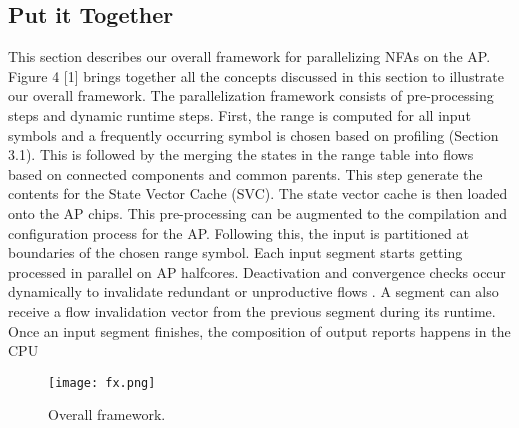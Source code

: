 \subsection{Put it Together}
This section describes our overall framework for parallelizing NFAs
on the AP. Figure 4 [1] brings together all the concepts discussed in this
section to illustrate our overall framework. The parallelization framework consists of pre-processing steps and dynamic runtime steps.
First, the range is computed for all input symbols and a frequently
occurring symbol is chosen based on profiling (Section 3.1). This
is followed by the merging the states in the range table into flows
based on connected components and common parents.
This step generate the contents for the
State Vector Cache (SVC). The state vector cache is then loaded
onto the AP chips. This pre-processing can be augmented to the
compilation and configuration process for the AP. Following this,
the input is partitioned at boundaries of the chosen range symbol.
Each input segment starts getting processed in parallel on AP halfcores. Deactivation and convergence checks occur dynamically to
invalidate redundant or unproductive flows .
A segment can also receive a flow invalidation vector from the previous segment during its runtime. Once an input segment finishes, the
composition of output reports happens in the CPU 
\begin{figure}[!h]
    \texttt{[image: fx.png]}
    \centering
    \caption{Overall framework.}
\end{figure}